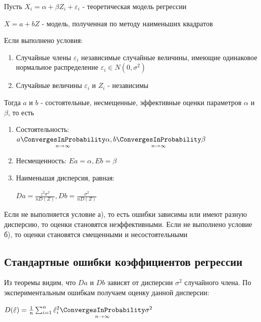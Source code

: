 \documentclass[12pt]{article}
\begin{document}
\begin{MyTheorem}
    \Ths Пусть $X_i = \alpha + \beta Z_i + \varepsilon_i$ - теоретическая модель регрессии

    $X = a + b Z$ - модель, полученная по методу наименьших квадратов

    Если выполнено условия:

    \begin{enumerate}[label=\asbuk*),ref=\asbuk*]
        \item Случайные члены $\varepsilon_i$ независимые случайные величины, имеющие одинаковое нормальное распределение $\varepsilon_i \in N(0, \sigma^2)$
        \item Случайные величины $\varepsilon_i$ и $Z_i$ - независимы
    \end{enumerate}

    Тогда $a$ и $b$ - состоятельные, несмещенные, эффективные оценки параметров $\alpha$ и $\beta$, то есть

    \begin{enumerate}
        \item Состоятельность: $a \underset{n \to \infty}{\ConvergesInProbability} \alpha, b \underset{n \to \infty}{\ConvergesInProbability} \beta$
        \item Несмещенность: $Ea = \alpha, Eb = \beta$
        \item Наименьшая дисперсия, равная:

        $D a = \frac{\overline{z^2} \sigma^2}{n D(Z)}, Db = \frac{\sigma^2}{n D(Z)}$
    \end{enumerate}
\end{MyTheorem}

\Nota Если не выполняется условие а), то есть ошибки зависимы или имеют разную дисперсию, то оценки становятся неэффективными. 
Если не выполнено условие б), то оценки становятся смещенными и несостоятельными

\subsection{Стандартные ошибки коэффициентов регрессии}

\hypertarget{regression_coefficient_error}{}

Из теоремы видим, что $Da$ и $Db$ зависят от дисперсии $\sigma^2$ случайного члена. 
По экспериментальным ошибкам получаем оценку данной дисперсии:

$D(\hat \varepsilon) = \frac{1}{n} \sum_{i = 1}^n {\hat \varepsilon_i}^2 \underset{n \to \infty}{\ConvergesInProbability} \sigma^2$
\end{document}
